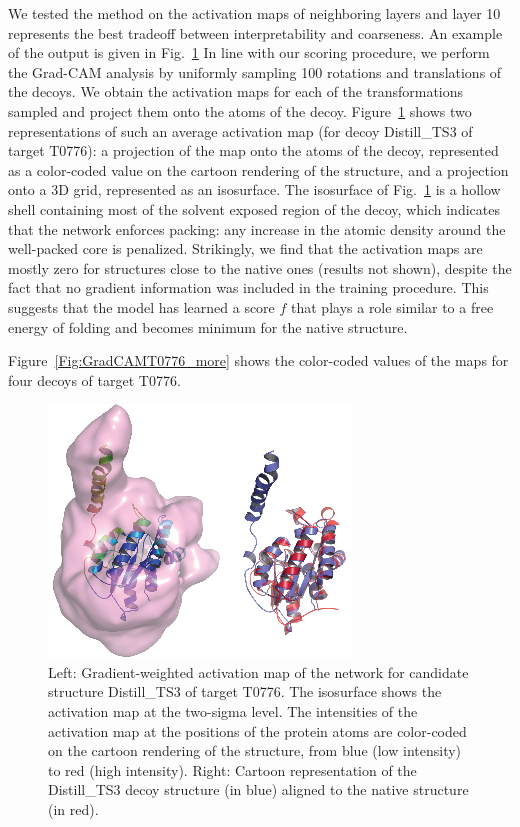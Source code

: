 %
We tested the method on the activation maps of neighboring layers and
layer 10 represents the best tradeoff between interpretability and
coarseness.
%
An example of the output is given in Fig.~\ref{Fig:GradCAMT0776}
%
In line with our scoring procedure, we perform the Grad-CAM analysis
by uniformly sampling 100 rotations and translations of the decoys. We
obtain the activation maps for each of the transformations sampled and
project them onto the atoms of the
decoy. Figure~\ref{Fig:GradCAMT0776} shows two representations of such
an average activation map (for decoy Distill\_TS3 of target T0776): a
projection of the map onto the atoms of the decoy, represented as a
color-coded value on the cartoon rendering of the structure, and a
projection onto a 3D grid, represented as an isosurface. The
isosurface of Fig.~\ref{Fig:GradCAMT0776} is a hollow shell containing
most of the solvent exposed region of the decoy, which indicates that
the network enforces packing: any increase in the atomic density
around the well-packed core is penalized.
%
Strikingly, we find that the activation maps are mostly zero for
structures close to the native ones (results not shown), despite the
fact that no gradient information was included in the training
procedure. This suggests that the model has learned a score $f$ that
plays a role similar to a free energy of folding and becomes minimum
for the native structure.

Figure~\ref{Fig:GradCAMT0776_more} shows the color-coded
values of the maps for four decoys of target T0776.


\begin{figure}[H]
    \centering
    \includegraphics[width=0.5\linewidth]{Fig/FigT0776.eps}
%
    \caption{Left: Gradient-weighted activation map of the network for
    candidate structure Distill\_TS3 of target T0776. The isosurface
    shows the activation map at the two-sigma level. The intensities
    of the activation map at the positions of the protein atoms are
    color-coded on the cartoon rendering of the structure, from blue
    (low intensity) to red (high intensity). Right: Cartoon
    representation of the Distill\_TS3 decoy structure (in blue)
    aligned to the native structure (in red).}
%
    \label{Fig:GradCAMT0776}
\end{figure}

